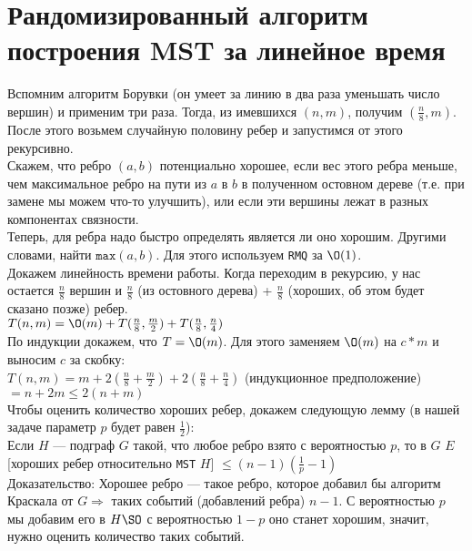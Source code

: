   \section{Рандомизированный алгоритм построения MST за линейное время}
	Вспомним алгоритм Борувки (он умеет за линию в два раза уменьшать число вершин) и применим три раза. Тогда, из имевшихся $(n, m)$, получим $(\frac{n}{8}, m)$. После этого возьмем случайную половину ребер и запустимся от этого рекурсивно. \\
	Скажем, что ребро $(a, b)$ потенциально хорошее, если вес этого ребра меньше, чем максимальное ребро на пути из $a$ в $b$ в полученном остовном дереве (т.е. при замене мы можем что-то улучшить), или если эти вершины лежат в разных компонентах связности. \\
	Теперь, для ребра надо быстро определять является ли оно хорошим. Другими словами, найти $\texttt{max}(a, b)$. Для этого используем \texttt{RMQ} за $\O(1)$. \\
	Докажем линейность времени работы. Когда переходим в рекурсию, у нас остается $\frac{n}{8}$ вершин и $\frac{n}{8}$ (из остовного дерева) + $\frac{n}{8}$ (хороших, об этом будет сказано позже) ребер. \\
	$T(n, m) = \O(m) + T(\frac{n}{8}, \frac{m}{2}) + T(\frac{n}{8}, \frac{n}{4})$ \\
	По индукции докажем,  что $T = \O(m)$. Для этого заменяем $\O(m)$ на $c * m$ и выносим $c$ за скобку: \\
	$T(n, m) = m + 2(\frac{n}{8} + \frac{m}{2}) + 2(\frac{n}{8} + \frac{n}{4}) $ (индукционное предположение) $ = n + 2m \le 2(n + m)$ \\
	Чтобы оценить количество хороших ребер, докажем следующую лемму (в нашей задаче параметр $p$ будет равен  $\frac{1}{2}$): \\ 
	Если $H$ — подграф $G$ такой, что любое ребро взято с вероятностью $p$, то в $G$ $E$[хороших ребер относительно \texttt{MST} $H$] $\le (n - 1)(\frac{1}{p} - 1)$ \\
	Доказательство: Хорошее ребро — такое ребро, которое добавил бы алгоритм Краскала от $G \Rightarrow $ таких событий (добавлений ребра) $n - 1$. С вероятностью $p$ мы добавим его в $H \SO$ с вероятностью $1 - p$ оно станет хорошим, значит, нужно оценить количество таких событий. \\
